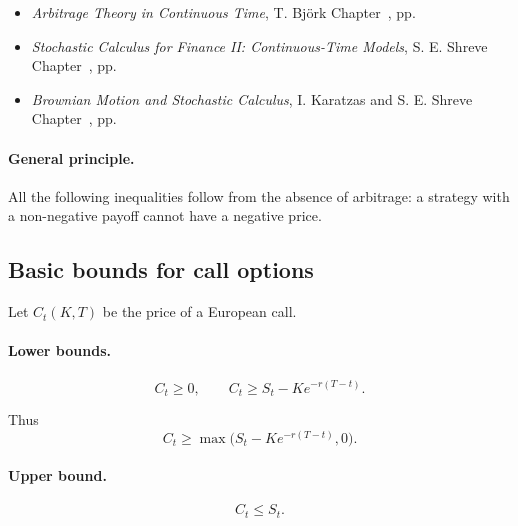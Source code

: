 \documentclass[11pt]{article}
\newcommand{\1}{\mathbf{1}}
\theoremstyle{plain}
\theoremstyle{definition}
\theoremstyle{remark}
\begin{document}
\begin{itemize}[leftmargin=1.4em]

\item \textit{Arbitrage Theory in Continuous Time},  
T. Björk  
\hfill Chapter~\underline{\hspace{1cm}}, pp.~\underline{\hspace{1cm}}

\item \textit{Stochastic Calculus for Finance II: Continuous-Time Models},  
S. E. Shreve  
\hfill Chapter~\underline{\hspace{1cm}}, pp.~\underline{\hspace{1cm}}

\item \textit{Brownian Motion and Stochastic Calculus},  
I. Karatzas and S. E. Shreve  
\hfill Chapter~\underline{\hspace{1cm}}, pp.~\underline{\hspace{1cm}}

\end{itemize}


\paragraph{General principle.}
All the following inequalities follow from the absence of arbitrage:
a strategy with a non-negative payoff cannot have a negative price.

\medskip

\subsection{Basic bounds for call options}

Let \(C_t(K,T)\) be the price of a European call.

\paragraph{Lower bounds.}
\[
C_t \ge 0,
\qquad
C_t \ge S_t - K e^{-r(T-t)}.
\]

Thus
\[
\boxed{
C_t \ge \max\!\big(S_t-K e^{-r(T-t)},0\big).
}
\]

\paragraph{Upper bound.}
\[
\boxed{
C_t \le S_t.
}
\]
\end{document}

